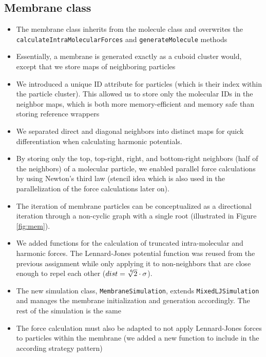 \documentclass{article}
\begin{document}
    \subsection{Membrane class}
    \label{sec:mem:mem}
        \begin{itemize}
            \item The membrane class inherits from the molecule class and overwrites the \texttt{calculateIntraMolecularForces} and \texttt{generateMolecule} methods
            \item Essentially, a membrane is generated exactly as a cuboid cluster would, except that we store maps of neighboring particles 
            \item We introduced a unique ID attribute for particles (which is their index within the particle cluster). This allowed us to store only the molecular IDs in the neighbor maps, which is both more memory-efficient and memory safe than storing reference wrappers
            \item We separated direct and diagonal neighbors into distinct maps for quick differentiation when calculating harmonic potentials.
            \item By storing only the top, top-right, right, and bottom-right neighbors (half of the neighbors) of a molecular particle, we enabled parallel force calculations by using Newton's third law (stencil idea which is also used in the parallelization of the force calculations later on).
            \item The iteration of membrane particles can be conceptualized as a directional iteration through a non-cyclic graph with a single root (illustrated in Figure \ref{fig:mem}).
            \item We added functions for the calculation of truncated intra-molecular and harmonic forces. The Lennard-Jones potential function was reused from the previous assignment while only applying it to non-neighbors that are close enough to repel each other ($dist = \sqrt[\leftroot{-2}\uproot{2}6]{2} \cdot \sigma$).
            \item The new simulation class, \texttt{MembraneSimulation}, extends \texttt{MixedLJSimulation} and manages the membrane initialization and generation accordingly. The rest of the simulation is the same
            \item The force calculation must also be adapted to not apply Lennard-Jones forces to particles within the membrane (we added a new function to include in the according strategy pattern)
        \end{itemize}
\end{document}

